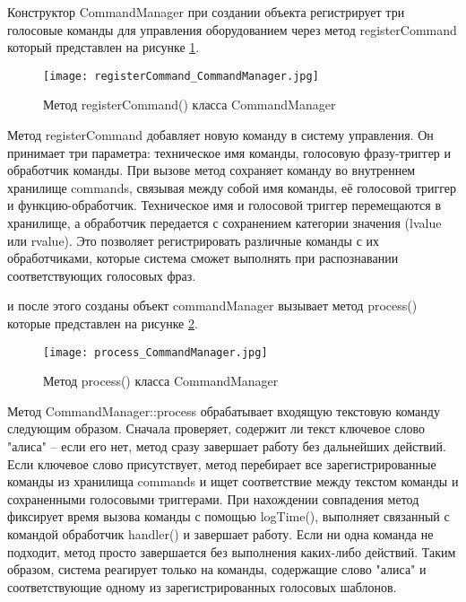 Конструктор CommandManager при создании объекта регистрирует три голосовые команды для управления оборудованием через метод registerCommand который представлен на рисунке \ref{fig:registerCommand_CommandManager}.

\begin{figure}[H]
	\centering
	\texttt{[image: registerCommand\_CommandManager.jpg]}
	\caption{Метод registerCommand()  класса CommandManager}
	\label{fig:registerCommand_CommandManager}
\end{figure}

Метод registerCommand добавляет новую команду в систему управления. Он принимает три параметра: техническое имя команды, голосовую фразу-триггер и обработчик команды. При вызове метод сохраняет команду во внутреннем хранилище commands, связывая между собой имя команды, её голосовой триггер и функцию-обработчик. Техническое имя и голосовой триггер перемещаются в хранилище, а обработчик передается с сохранением категории значения (lvalue или rvalue). Это позволяет регистрировать различные команды с их обработчиками, которые система сможет выполнять при распознавании соответствующих голосовых фраз.

 и после этого созданы объект commandManager вызывает метод process() которые представлен на рисунке \ref{fig:process_CommandManager}.

\begin{figure}[H]
	\centering
	\texttt{[image: process\_CommandManager.jpg]}
	\caption{Метод process()  класса CommandManager}
	\label{fig:process_CommandManager}
\end{figure}

Метод CommandManager::process обрабатывает входящую текстовую команду следующим образом. Сначала проверяет, содержит ли текст ключевое слово "алиса" -- если его нет, метод сразу завершает работу без дальнейших действий. Если ключевое слово присутствует, метод перебирает все зарегистрированные команды из хранилища commands и ищет соответствие между текстом команды и сохраненными голосовыми триггерами. При нахождении совпадения метод фиксирует время вызова команды с помощью logTime(), выполняет связанный с командой обработчик handler() и завершает работу. Если ни одна команда не подходит, метод просто завершается без выполнения каких-либо действий. Таким образом, система реагирует только на команды, содержащие слово "алиса" и соответствующие одному из зарегистрированных голосовых шаблонов.

\newpage
